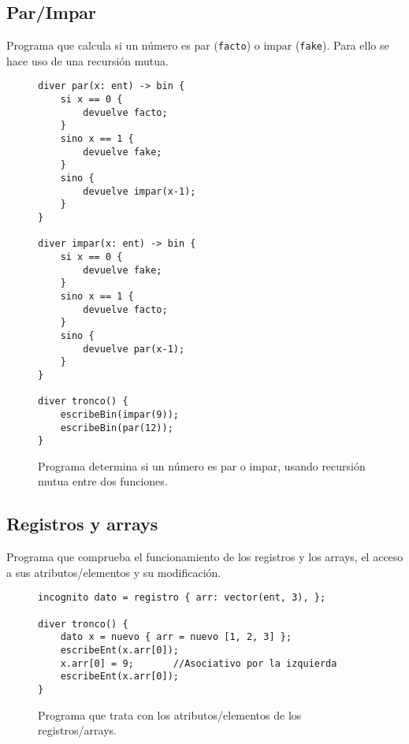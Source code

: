 \subsection{Par/Impar}
Programa que calcula si un número es par (\lstinline{facto}) o impar
(\lstinline{fake}). Para ello se hace uso de una recursión mutua.
\begin{figure}[htbp]
    \centering
    \begin{lstlisting}
diver par(x: ent) -> bin {
    si x == 0 {
        devuelve facto;
    }
    sino x == 1 {
        devuelve fake;
    }
    sino {
        devuelve impar(x-1);
    }
}

diver impar(x: ent) -> bin {
    si x == 0 {
        devuelve fake;
    }
    sino x == 1 {
        devuelve facto;
    }
    sino {
        devuelve par(x-1);
    }
}

diver tronco() {
    escribeBin(impar(9));
    escribeBin(par(12));
}
    \end{lstlisting}
    \caption{Programa determina si un número es par o impar, usando recursión
    mutua entre dos funciones.}
\end{figure}

\subsection{Registros y arrays}
Programa que comprueba el funcionamiento de los registros y los arrays, el
acceso a sus atributos/elementos y su modificación.
\begin{figure}[htbp]
    \centering
    \begin{lstlisting}
incognito dato = registro { arr: vector(ent, 3), };

diver tronco() {
    dato x = nuevo { arr = nuevo [1, 2, 3] };
    escribeEnt(x.arr[0]);
    x.arr[0] = 9;       //Asociativo por la izquierda
    escribeEnt(x.arr[0]);
}
    \end{lstlisting}
    \caption{Programa que trata con los atributos/elementos de los
    registros/arrays.}
\end{figure}

